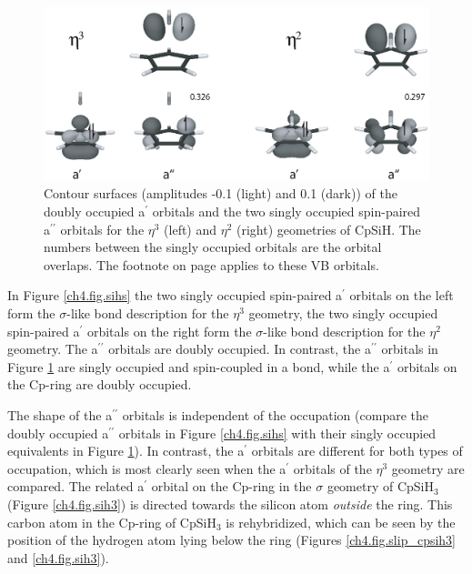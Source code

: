 \begin{figure} [htbp]
\begin{center}
\includegraphics[scale=0.67]{cyclopentadienyl/figures/sih_pi.eps}
\end{center}
\caption{Contour surfaces (amplitudes -0.1 (light) and 0.1 (dark)) of the doubly occupied a$^{\prime}$ orbitals and the two singly occupied spin-paired a$^{\prime\prime}$ orbitals for the $\eta^{3}$ (left) and $\eta^{2}$ (right) geometries of CpSiH. The numbers between the singly occupied orbitals are the orbital overlaps. The footnote on page \pageref{ch4.foot.consequence} applies to these VB orbitals.}
\label{ch4.fig.sihp}
\end{figure}

In Figure \ref{ch4.fig.sihs} the two singly occupied spin-paired a$^\prime$ orbitals on the left form the $\sigma$-like bond description for the $\eta^3$ geometry, the two singly occupied spin-paired a$^\prime$ orbitals on the right form the $\sigma$-like bond description for the $\eta^2$ geometry. The a$^{\prime\prime}$ orbitals are doubly occupied. In contrast, the a$^{\prime\prime}$ orbitals in Figure \ref{ch4.fig.sihp} are singly occupied and spin-coupled in a bond, while the a$^\prime$ orbitals on the Cp-ring are doubly occupied.

The shape of the a$^{\prime\prime}$ orbitals is independent of the occupation (compare the doubly occupied a$^{\prime\prime}$ orbitals in Figure \ref{ch4.fig.sihs} with their  singly occupied equivalents in Figure \ref{ch4.fig.sihp}). In contrast, the a$^\prime$ orbitals are different for both types of occupation, which is most clearly seen when the a$^\prime$ orbitals of the $\eta^3$ geometry are compared. The related a$^\prime$ orbital on the Cp-ring in the $\sigma$ geometry of CpSiH$_3$ (Figure \ref{ch4.fig.sih3}) is directed towards the silicon atom \textit{outside} the ring. This carbon atom in the Cp-ring of CpSiH$_3$ is rehybridized, which can be seen by the position of the hydrogen atom lying below the ring (Figures \ref{ch4.fig.slip_cpsih3} and \ref{ch4.fig.sih3}).


